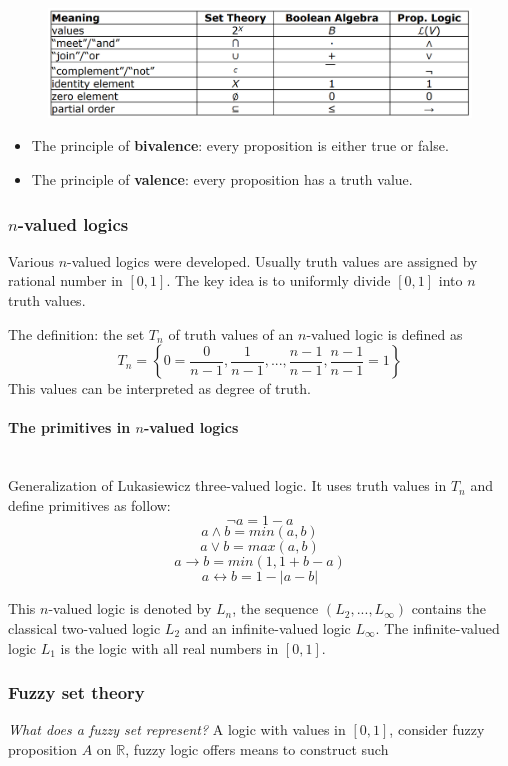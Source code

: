 \documentclass{article}
\begin{document}
\begin{figure}[H]
    \centering
    \includegraphics[scale=0.35]{images/bool-counter.png}
\end{figure}
\begin{itemize}
    \item The principle of \textbf{bivalence}: every proposition is either true or false.
    \item The principle of \textbf{valence}: every proposition has a truth value.
\end{itemize}
\subsubsection{$n$-valued logics}
Various $n$-valued logics were developed. Usually truth values are assigned by rational number in
$[0,1]$. The key idea is to uniformly divide $[0,1]$ into $n$ truth values.

The definition: the set $T_n$ of truth values of an $n$-valued logic is defined as
$$T_n=\left\{0=\frac{0}{n-1},\frac{1}{n-1},...,\frac{n-1}{n-1},\frac{n-1}{n-1}=1\right\}$$
This values can be interpreted as degree of truth.
\paragraph{The primitives in $n$-valued logics}\mbox{}\\
Generalization of Lukasiewicz three-valued logic. It uses truth values in $T_n$ and define primitives as follow:
$$\lnot a = 1-a$$
$$a\land b =min(a,b)$$
$$a\lor b =max(a,b)$$
$$a\rightarrow b = min(1,1+b-a)$$
$$a\longleftrightarrow b= 1-|a-b|$$

This $n$-valued logic is denoted by $L_n$, the sequence $(L_2,...,L_\infty)$ contains the
classical two-valued logic $L_2$ and an infinite-valued logic $L_\infty$. The infinite-valued
logic $L_1$ is the logic with all real numbers in $[0,1]$.

\subsubsection{Fuzzy set theory}
\textit{What does a fuzzy set represent?} A logic with values in $[0,1]$, consider fuzzy
proposition $A$ on $\mathbb{R}$, fuzzy logic offers means to construct such
\end{document}
